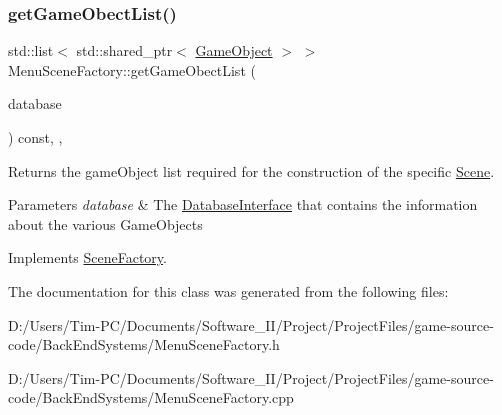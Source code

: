 \subsubsection{\texorpdfstring{get\+Game\+Obect\+List()}{getGameObectList()}}
{\footnotesize\ttfamily std\+::list$<$ std\+::shared\+\_\+ptr$<$ \hyperlink{class_game_object}{Game\+Object} $>$ $>$ Menu\+Scene\+Factory\+::get\+Game\+Obect\+List (\begin{DoxyParamCaption}\item[{std\+::shared\+\_\+ptr$<$ \hyperlink{class_database_interface}{Database\+Interface} $>$}]{database }\end{DoxyParamCaption}) const\hspace{0.3cm}{\ttfamily [final]}, {\ttfamily [protected]}, {\ttfamily [virtual]}}



Returns the game\+Object list required for the construction of the specific \hyperlink{class_scene}{Scene}. 


\begin{DoxyParams}{Parameters}
{\em database} & The \hyperlink{class_database_interface}{Database\+Interface} that contains the information about the various Game\+Objects \\
\hline
\end{DoxyParams}


Implements \hyperlink{class_scene_factory_a2c8541230e95df49d2ab39b7c6ecdb78}{Scene\+Factory}.



The documentation for this class was generated from the following files\+:\begin{DoxyCompactItemize}
\item 
D\+:/\+Users/\+Tim-\/\+P\+C/\+Documents/\+Software\+\_\+\+I\+I/\+Project/\+Project\+Files/game-\/source-\/code/\+Back\+End\+Systems/Menu\+Scene\+Factory.\+h\item 
D\+:/\+Users/\+Tim-\/\+P\+C/\+Documents/\+Software\+\_\+\+I\+I/\+Project/\+Project\+Files/game-\/source-\/code/\+Back\+End\+Systems/Menu\+Scene\+Factory.\+cpp\end{DoxyCompactItemize}
